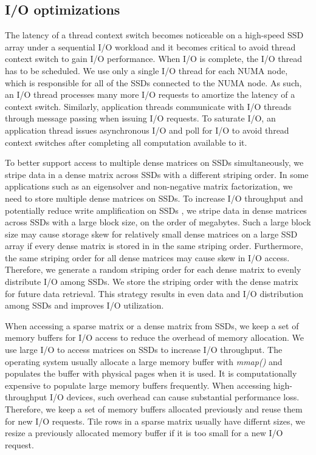 \subsection{I/O optimizations}
The latency of a thread context switch becomes noticeable on a high-speed SSD
array under a sequential I/O workload and it becomes critical to avoid thread
context switch to gain I/O performance. When I/O is complete, the I/O thread
 has to be scheduled. We use only a single I/O
thread for each NUMA node, which is responsible for all of the SSDs connected
to the NUMA node. As such, an I/O
thread processes many more I/O requests to amortize the latency of a context
switch. Similarly, application threads communicate with I/O threads through
message passing when issuing I/O requests. To saturate I/O,
an application thread issues asynchronous I/O and poll for I/O to avoid thread
context switches after completing all computation available to it.

To better support access to multiple dense matrices on SSDs simultaneously, we
stripe data in a dense matrix across SSDs with a different striping order.
In some applications such as an eigensolver and non-negative matrix factorization,
we need to store multiple dense matrices on SSDs. To increase I/O throughput and
potentially reduce write amplification on SSDs \cite{Tang15}, we stripe data
in dense matrices across SSDs with a large block size, on the order of megabytes.
Such a large block size may cause storage skew for relatively small dense matrices
on a large SSD array if every dense matrix is stored in in the same striping order.
Furthermore, the same striping order for all dense matrices may cause skew in
I/O access. Therefore, we generate a random striping order for each dense
matrix to evenly distribute I/O among SSDs. We store the striping order
with the dense matrix for future data retrieval. This strategy results in even
data and I/O distribution among SSDs and improves I/O utilization. 

When accessing a sparse matrix or a dense matrix from SSDs, we keep a set of
memory buffers for I/O access to reduce the overhead of memory allocation.
We use large I/O to access matrices on SSDs to increase I/O throughput.
The operating system usually allocate a large memory buffer with \textit{mmap()}
and populates the buffer with physical pages when it is used. It is
computationally expensive to populate
large memory buffers frequently. When accessing high-throughput I/O devices,
such overhead can cause substantial performance loss. Therefore, we keep a set
of memory buffers allocated previously and reuse them for new I/O requests.
Tile rows in a sparse matrix usually have differnt sizes, we resize a previously
allocated memory buffer if it is too small for a new I/O request.

